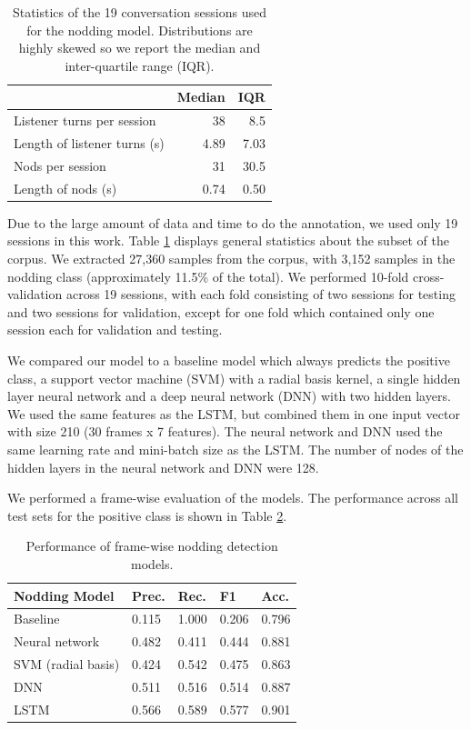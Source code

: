 \documentclass[letterpaper]{article} %
\begin{document}
\begin{table}[h]
\begin{center}
\begin{tabular}{|l|r|r|}
\hline & \bf Median & \bf IQR \\ \hline
Listener turns per session & 38 & 8.5\\
Length of listener turns (s) & 4.89 & 7.03\\
Nods per session & 31 & 30.5\\
Length of nods (s) & 0.74 & 0.50\\
\hline
\end{tabular}
\end{center}
\caption{\label{corpus} Statistics of the 19 conversation sessions used for the nodding model. Distributions are highly skewed so we report the median and inter-quartile range (IQR).}
\end{table}

Due to the large amount of data and time to do the annotation, we used only 19 sessions in this work. Table \ref{corpus} displays general statistics about the subset of the corpus. We extracted 27,360 samples from the corpus, with 3,152 samples in the nodding class (approximately 11.5\% of the total). We performed 10-fold cross-validation across 19 sessions, with each fold consisting of two sessions for testing and two sessions for validation, except for one fold which contained only one session each for validation and testing.


We compared our model to a baseline model which always predicts the positive class, a support vector machine (SVM) with a radial basis kernel, a single hidden layer neural network and a deep neural network (DNN) with two hidden layers. We used the same features as the LSTM, but combined them in one input vector with size 210 (30 frames x 7 features). The neural network and DNN used the same learning rate and mini-batch size as the LSTM. The number of nodes of the hidden layers in the neural network and DNN were 128.

We performed a frame-wise evaluation of the models. The performance across all test sets for the positive class is shown in Table \ref{nodresults}.

\begin{table}[h]
\begin{center}
\begin{tabular}{|l|l|l|l|l|}
\hline \bf Nodding Model & \bf Prec. & \bf Rec. & \bf F1 & \bf Acc. \\ \hline
Baseline & 0.115 & 1.000 & 0.206 & 0.796\\
Neural network & 0.482 & 0.411 & 0.444 & 0.881\\
SVM (radial basis) & 0.424 & 0.542 & 0.475 & 0.863\\
DNN & 0.511 & 0.516 & 0.514 & 0.887\\
LSTM & 0.566 & 0.589 & 0.577 & 0.901\\
\hline
\end{tabular}
\end{center}
\caption{\label{nodresults} Performance of frame-wise nodding detection models.}
\end{table}
\end{document}
